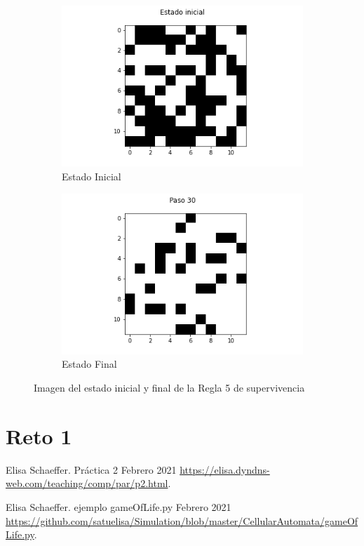 \documentclass{article}
\begin{document}
\begin{figure}[H]
\centering
\begin{subfigure}[b]{0.45\linewidth}
\includegraphics[width=\linewidth]{p2_r5_t00_p.png}
\caption{Estado Inicial}
\end{subfigure}
\begin{subfigure}[b]{0.45\linewidth}
\includegraphics[width=\linewidth]{p2_r5_t30_p.png}
\caption{Estado Final}
\end{subfigure}
\caption{Imagen del estado inicial y final de la Regla 5 de supervivencia}
\label{fig:westminster}
\end{figure}


\section{Reto 1}

\begin{thebibliography}{99} %

 Elisa Schaeffer. Práctica 2 Febrero 2021
\url{https://elisa.dyndns-web.com/teaching/comp/par/p2.html}.

 Elisa Schaeffer. ejemplo gameOfLife.py Febrero 2021
\url{https://github.com/satuelisa/Simulation/blob/master/CellularAutomata/gameOfLife.py}.


\end{thebibliography}
\end{document}
